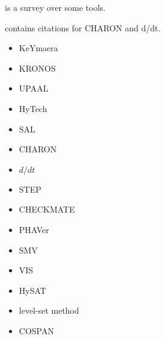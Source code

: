 \cite{Silva2001} is a survey over some tools.

\cite{Raskin2005} contains citations for CHARON and d/dt.

\begin{itemize}
    \item{KeYmaera \cite{Platzer2011a}}
    \item{KRONOS \cite{Nicollin1993,Alur1997}}
    \item{UPAAL \cite{Alur1997}}
    \item{HyTech \cite{Henzinger1997,Alur1997,Alur1996,Henzinger}}
    \item{SAL \cite{Tiwari2002}}
    \item{CHARON}
    \item{$d/dt$ \cite{Asarin2002,Asarin2000}}
    \item{STEP \cite{}}
    \item{CHECKMATE}
    \item{PHAVer}
    \item{SMV}
    \item{VIS}
    \item{HySAT}
    \item{level-set method}
    \item{COSPAN}
\end{itemize}
